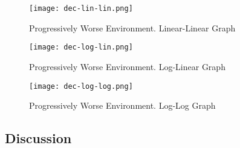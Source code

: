 \begin{figure}[ht]
    \centering
    \texttt{[image: dec-lin-lin.png]}
    \caption{Progressively Worse Environment. Linear-Linear Graph}
    \label{fig:fn}
\end{figure}

\begin{figure}[ht]
    \centering
    \texttt{[image: dec-log-lin.png]}
    \caption{Progressively Worse Environment. Log-Linear Graph}
    \label{fig:fn}
\end{figure}

\begin{figure}[ht]
    \centering
    \texttt{[image: dec-log-log.png]}
    \caption{Progressively Worse Environment. Log-Log Graph}
    \label{fig:fn}
\end{figure}


\subsection{Discussion}

